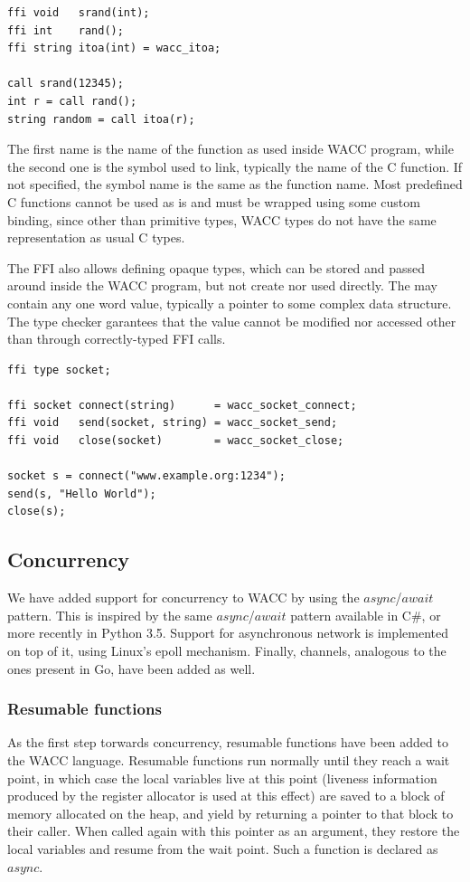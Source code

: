 \documentclass{article}
\begin{document}
\begin{lstlisting}
ffi void   srand(int);
ffi int    rand();
ffi string itoa(int) = wacc_itoa;

call srand(12345);
int r = call rand();
string random = call itoa(r);
\end{lstlisting}

The first name is the name of the function as used inside WACC program, while the second one is the symbol used to link,
typically the name of the C function. If not specified, the symbol name is the same as the function name.
Most predefined C functions cannot be used as is and must be wrapped using some custom binding, since other than primitive
types, WACC types do not have the same representation as usual C types.

The FFI also allows defining opaque types, which can be stored and passed around inside the WACC program, but not create nor
used directly. The may contain any one word value, typically a pointer to some complex data structure. The type checker
garantees that the value cannot be modified nor accessed other than through correctly-typed FFI calls.

\begin{lstlisting}
ffi type socket;

ffi socket connect(string)      = wacc_socket_connect;
ffi void   send(socket, string) = wacc_socket_send;
ffi void   close(socket)        = wacc_socket_close;

socket s = connect("www.example.org:1234");
send(s, "Hello World");
close(s);
\end{lstlisting}

\subsection{Concurrency}
We have added support for concurrency to WACC by using the $async$/$await$ pattern. This is inspired by the same
$async$/$await$ pattern available in C\#, or more recently in Python 3.5. Support for asynchronous network is
implemented on top of it, using Linux's epoll mechanism. Finally, channels, analogous to the ones present in Go,
have been added as well.

\subsubsection{Resumable functions}
As the first step torwards concurrency, resumable functions have been added to the WACC language.
Resumable functions run normally until they reach a wait point, in which case the local variables live at this point
(liveness information produced by the register allocator is used at this effect) are saved to a block of memory allocated
on the heap, and yield by returning a pointer to that block to their caller. When called again with this pointer as an argument,
they restore the local variables and resume from the wait point.
Such a function is declared as $async$.
\end{document}
